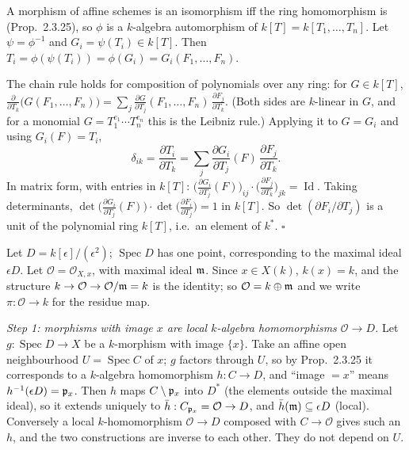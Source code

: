 \documentclass[11pt]{article}
\begin{document}
\pf
A morphism of affine schemes is an isomorphism iff the ring homomorphism is (Prop.~2.3.25), so $\phi$ is a $k$-algebra automorphism of $k[T]=k[T_1,\dots,T_n]$. Let $\psi=\phi^{-1}$ and $G_i=\psi(T_i)\in k[T]$. Then $T_i=\phi(\psi(T_i))=\phi(G_i)=G_i(F_1,\dots,F_n)$.

The chain rule holds for composition of polynomials over any ring: for $G\in k[T]$, $\frac{\partial}{\partial T_k}\bigl(G(F_1,\dots,F_n)\bigr)=\sum_j\frac{\partial G}{\partial T_j}(F_1,\dots,F_n)\,\frac{\partial F_j}{\partial T_k}$. (Both sides are $k$-linear in $G$, and for a monomial $G=T_1^{e_1}\cdots T_n^{e_n}$ this is the Leibniz rule.) Applying it to $G=G_i$ and using $G_i(F)=T_i$,
\[ \delta_{ik}=\frac{\partial T_i}{\partial T_k}=\sum_j\frac{\partial G_i}{\partial T_j}(F)\,\frac{\partial F_j}{\partial T_k}. \]
In matrix form, with entries in $k[T]$: $\bigl(\frac{\partial G_i}{\partial T_j}(F)\bigr)_{ij}\cdot\bigl(\frac{\partial F_j}{\partial T_k}\bigr)_{jk}=\operatorname{Id}$. Taking determinants, $\det\bigl(\frac{\partial G_i}{\partial T_j}(F)\bigr)\cdot\det\bigl(\frac{\partial F_i}{\partial T_j}\bigr)=1$ in $k[T]$. So $\det(\partial F_i/\partial T_j)$ is a unit of the polynomial ring $k[T]$, i.e.\ an element of $k^*$. \hfill$\square$

\pf
Let $D=k[\epsilon]/(\epsilon^2)$; $\operatorname{Spec}D$ has one point, corresponding to the maximal ideal $\epsilon D$. Let $\mathcal O=\mathcal O_{X,x}$, with maximal ideal $\mathfrak m$. Since $x\in X(k)$, $k(x)=k$, and the structure $k\to\mathcal O\to\mathcal O/\mathfrak m=k$ is the identity; so $\mathcal O=k\oplus\mathfrak m$ and we write $\pi:\mathcal O\to k$ for the residue map.

\emph{Step 1: morphisms with image $x$ are local $k$-algebra homomorphisms $\mathcal O\to D$.} Let $g:\operatorname{Spec}D\to X$ be a $k$-morphism with image $\{x\}$. Take an affine open neighbourhood $U=\operatorname{Spec}C$ of $x$; $g$ factors through $U$, so by Prop.~2.3.25 it corresponds to a $k$-algebra homomorphism $h:C\to D$, and ``image $=x$'' means $h^{-1}(\epsilon D)=\mathfrak p_x$. Then $h$ maps $C\setminus\mathfrak p_x$ into $D^*$ (the elements outside the maximal ideal), so it extends uniquely to $\bar h:C_{\mathfrak p_x}=\mathcal O\to D$, and $\bar h(\mathfrak m)\subseteq\epsilon D$ (local). Conversely a local $k$-homomorphism $\mathcal O\to D$ composed with $C\to\mathcal O$ gives such an $h$, and the two constructions are inverse to each other. They do not depend on $U$.
\end{document}
